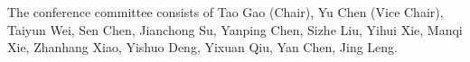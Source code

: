 The conference committee consists of Tao Gao (Chair), Yu Chen (Vice Chair),
Taiyun Wei, Sen Chen, Jianchong Su, Yanping Chen, Sizhe Liu, Yihui Xie,
Manqi Xie, Zhanhang Xiao, Yishuo Deng, Yixuan Qiu, Yan Chen, Jing Leng.

\address{Jing Leng\\
  School of Statistics, Renmin University of China\\
  Beijing, China P. R.}\\

\address{Jingjing Guan\\
  College of Business, City University of Hong Kong\\
   Hong Kong SAR}\\
